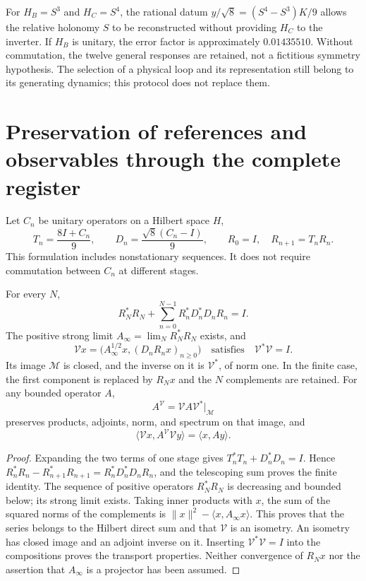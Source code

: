 For \(H_B=S^3\) and \(H_C=S^4\), the rational datum
\(y/\sqrt8=(S^4-S^3)K/9\) allows the relative holonomy
\(S\) to be reconstructed without providing \(H_C\) to the inverter. If \(H_B\) is
unitary, the error factor is approximately \(0.01435510\). Without
commutation, the twelve general responses are retained, not a fictitious
symmetry hypothesis. The selection of a physical loop and its representation
still belong to its generating dynamics; this protocol does not
replace them.

\section{Preservation of references and observables through the complete register}
\label{x_reciprocidad:lib01:memoria-completa}

Let \(C_n\) be unitary operators on a Hilbert space \(H\),
\[
 T_n=\frac{8I+C_n}{9},\qquad
 D_n=\frac{\sqrt8(C_n-I)}9,\qquad
 R_0=I,\quad R_{n+1}=T_nR_n.
\]
This formulation includes nonstationary sequences. It does not require commutation between \(C_n\) at different stages.

\begin{theorem}
\label{x_reciprocidad:lib01:isometria}
For every \(N\),
\[
 R_N^*R_N+\sum_{n=0}^{N-1}R_n^*D_n^*D_nR_n=I.
\]
The positive strong limit \(A_\infty=\lim_N R_N^*R_N\) exists, and
\begin{equation}
 \mathcal Vx=
 \bigl(A_\infty^{1/2}x,(D_nR_nx)_{n\geq0}\bigr)
 \quad\text{satisfies}\quad\mathcal V^*\mathcal V=I.
 \label{x_reciprocidad:lib01:V-infinita}
\end{equation}
Its image \(\mathcal M\) is closed, and the inverse on it is \(\mathcal V^*\), of norm one. In the finite case, the first component is replaced by \(R_Nx\) and the \(N\) complements are retained. For any bounded operator \(A\),
\[
 A^{\mathcal V}=\mathcal VA\mathcal V^*\big|_{\mathcal M}
\]
preserves products, adjoints, norm, and spectrum on that image, and
\[
 \langle\mathcal Vx,A^{\mathcal V}\mathcal Vy\rangle
 =\langle x,Ay\rangle.
\]
\end{theorem}
\begin{proof}
Expanding the two terms of one stage gives \(T_n^*T_n+D_n^*D_n=I\). Hence \(R_n^*R_n-R_{n+1}^*R_{n+1}=R_n^*D_n^*D_nR_n\), and the telescoping sum proves the finite identity. The sequence of positive operators \(R_N^*R_N\) is decreasing and bounded below; its strong limit exists. Taking inner products with \(x\), the sum of the squared norms of the complements is \(\|x\|^2-\langle x,A_\infty x\rangle\). This proves that the series belongs to the Hilbert direct sum and that \(\mathcal V\) is an isometry. An isometry has closed image and an adjoint inverse on it. Inserting \(\mathcal V^*\mathcal V=I\) into the compositions proves the transport properties. Neither convergence of \(R_Nx\) nor the assertion that \(A_\infty\) is a projector has been assumed.
\end{proof}

